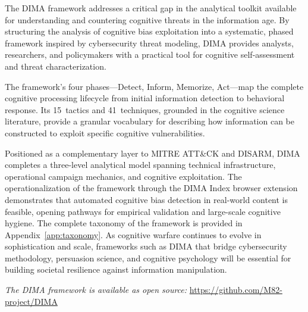 \documentclass[11pt,a4paper]{article}
\begin{document}
The DIMA framework addresses a critical gap in the analytical toolkit available for understanding and countering cognitive threats in the information age. By structuring the analysis of cognitive bias exploitation into a systematic, phased framework inspired by cybersecurity threat modeling, DIMA provides analysts, researchers, and policymakers with a practical tool for cognitive self-assessment and threat characterization.

The framework's four phases---Detect, Inform, Memorize, Act---map the complete cognitive processing lifecycle from initial information detection to behavioral response. Its 15~tactics and 41~techniques, grounded in the cognitive science literature, provide a granular vocabulary for describing how information can be constructed to exploit specific cognitive vulnerabilities.

Positioned as a complementary layer to MITRE ATT\&CK and DISARM, DIMA completes a three-level analytical model spanning technical infrastructure, operational campaign mechanics, and cognitive exploitation. The operationalization of the framework through the DIMA Index browser extension demonstrates that automated cognitive bias detection in real-world content is feasible, opening pathways for empirical validation and large-scale cognitive hygiene. The complete taxonomy of the framework is provided in Appendix~\ref{app:taxonomy}. As cognitive warfare continues to evolve in sophistication and scale, frameworks such as DIMA that bridge cybersecurity methodology, persuasion science, and cognitive psychology will be essential for building societal resilience against information manipulation.

\vspace{0.3cm}
\noindent\textit{The DIMA framework is available as open source:} \url{https://github.com/M82-project/DIMA}

\end{document}
